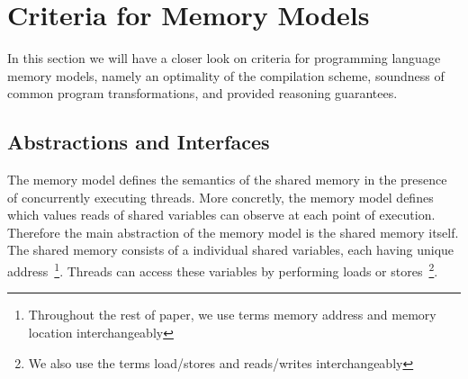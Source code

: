 \section{Criteria for Memory Models}
\label{sec:background}

In this section we will have a closer look on criteria for 
programming language memory models, 
namely an optimality of the compilation scheme, 
soundness of common program transformations, 
and provided reasoning guarantees.  

\subsection{Abstractions and Interfaces}
\label{sec:background:primitives}


The memory model defines the semantics of the shared memory 
in the presence of concurrently executing threads. 
More concretly, the memory model 
defines which values reads of shared variables 
can observe at each point of execution. 
Therefore the main abstraction of the memory model 
is the shared memory itself. 
The shared memory consists of a individual shared variables, 
each having unique address~\footnote{
Throughout the rest of paper, we use terms 
memory address and memory location interchangeably}.
Threads can access these variables by performing 
loads or stores~\footnote{We also use the terms 
load/stores and reads/writes interchangeably}.

